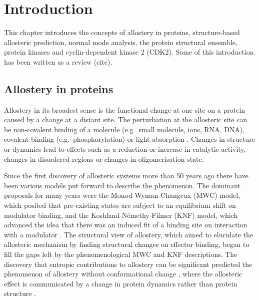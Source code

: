 \chapter{Introduction}
\label{cha:introduction}

This chapter introduces the concepts of allostery in proteins, structure-based allosteric prediction, normal mode analysis, the protein structural ensemble, protein kinases and cyclin-dependent kinase 2 (CDK2).
Some of this introduction has been written as a review (cite).


\section{Allostery in proteins}

Allostery in its broadest sense is the functional change at one site on a protein caused by a change at a distant site.
The perturbation at the allosteric site can be non-covalent binding of a molecule (e.g.\ small molecule, ions, RNA, DNA), covalent binding (e.g.\ phosphorylation) or light absorption \cite{Nussinov2013}.
Changes in structure or dynamics lead to effects such as a reduction or increase in catalytic activity, changes in disordered regions or changes in oligomerisation state.

Since the first discovery of allosteric systems more than 50 years ago there have been various models put forward to describe the phenomenon.
The dominant proposals for many years were the Monod-Wyman-Changeux (MWC) model, which posited that pre-existing states are subject to an equilibrium shift on modulator binding, and the Koshland-N\'{e}methy-Filmer (KNF) model, which advanced the idea that there was an induced fit of a binding site on interaction with a modulator \cite{Motlagh2014}.
The structural view of allostery, which aimed to elucidate the allosteric mechanism by finding structural changes on effector binding, began to fill the gaps left by the phenomenological MWC and KNF descriptions.
The discovery that entropic contributions to allostery can be significant predicted the phenomenon of allostery without conformational change \cite{Cooper1984}, where the allosteric effect is communicated by a change in protein dynamics rather than protein structure \cite{Motlagh2014}.

